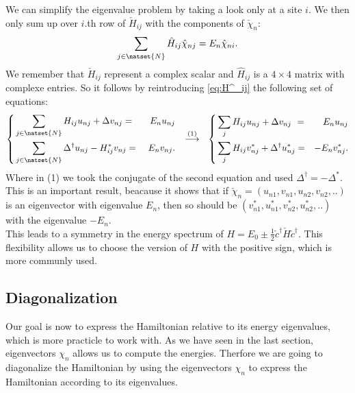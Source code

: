 \documentclass[../main.tex]{subfile}
\begin{document}
We can simplify the eigenvalue problem by taking a look only at a site $i$. We then only sum up over $i$.th row of $\check{H}_{ij}$ with the components of $\check{\chi}_n$:
\[
    \sum_{j\in\natset{N}}\hat{H}_{ij} \hat{\chi}_{nj} = E_n \hat{\chi}_{ni}.
\]
We remember that $\check{H}_{ij}$ represent a complex scalar and $\hat{H}_{ij}$ is a $4\times4$ matrix with complexe entries. So it follows by reintroducing \ref{eq:H^_ij} the following set of equations:
\begin{equation}
    \left\{
    \begin{aligned}
        &\sum_{j\in\natset{N}}H_{ij} u_{nj} + \Delta v_{nj} = &E_n u_{nj}\\
        &\sum_{j\in\natset{N}}\Delta^{\dagger} u_{nj} - H_{ij}^{\ast} v_{nj} =~& E_n v_{nj}.
    \end{aligned}
    \right.~~
    \stackrel{(1)}{\longrightarrow}~~
    \left\{
        \begin{aligned}
            &\sum_{j} H_{ij} u_{nj} + \Delta v_{nj} ~=& E_n u_{nj}\\
            &\sum_{j} H_{ij} v_{nj}^{\ast} + \Delta^{\dagger} u_{nj}^{\ast}= &-E_n v_{nj}^{\ast}.
        \end{aligned}
        \right.
\end{equation}
Where in (1) we took the conjugate of the second equation and used $\Delta^{\dagger} = -\Delta^{\ast}$.
This is an important result, beacause it shows that if $\check{\chi}_n = (u_{n1}, v_{n1},u_{n2}, v_{n2},.. )$ 
is an eigenvector with eigenvalue $E_n$, then  
so should be $(v_{n1}^{\ast}, u_{n1}^{\ast},v_{n2}^{\ast}, u_{n2}^{\ast},.. )$ with the eigenvalue $-E_n$.\\

This leads to a symmetry in the energy spectrum of $H = E_0 \pm \frac{1}{2}\check{c}^{\dagger}\check{H}\check{c}^{\dagger}$.
This flexibility allows us to choose the version of $H$ with the positive sign, which is more communly used.\\

\subsection{Diagonalization} \label{sec:Diagonalization}
Our goal is now to express the Hamiltonian relative to its energy eigenvalues, which is more practicle to work with.
As we have seen in the last section, eigenvectors $\chi_n$ allows us to compute the energies. Therfore we are going 
to diagonalize the Hamiltonian by using the eigenvectors $\chi_n$ to express the Hamiltonian according to its eigenvalues.\\
\end{document}
